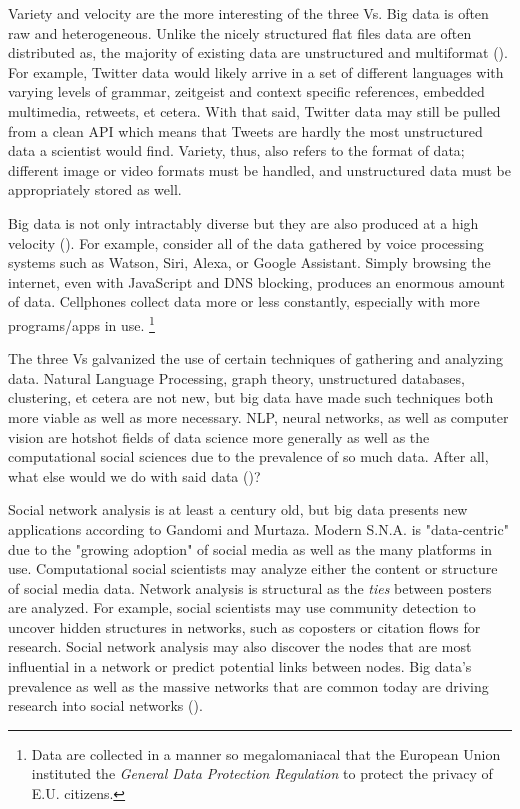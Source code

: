\documentclass[12pt, a4paper]{article}
\begin{document}
Variety and velocity are the more interesting of the three Vs. Big data is often raw and heterogeneous. Unlike the nicely structured flat files data are often distributed as, the majority of existing data are unstructured and multiformat (\cite{gandomiamir2015}). For example, Twitter data would likely arrive in a set of different languages with varying levels of grammar, zeitgeist and context specific references, embedded multimedia, retweets, et cetera. With that said, Twitter data may still be pulled from a clean API which means that Tweets are hardly the most unstructured data a scientist would find. Variety, thus, also refers to the format of data; different image or video formats must be handled, and unstructured data must be appropriately stored as well. 

Big data is not only intractably diverse but they are also produced at a high velocity (\cite{gandomiamir2015}). For example, consider all of the data gathered by voice processing systems such as Watson, Siri, Alexa, or Google Assistant. Simply browsing the internet, even with JavaScript and DNS blocking, produces an enormous amount of data. Cellphones collect data more or less constantly, especially with more programs/apps in use. \footnote{Data are collected in a manner so megalomaniacal that the European Union instituted the \textit{General Data Protection Regulation} to protect the privacy of E.U. citizens.}

The three Vs galvanized the use of certain techniques of gathering and analyzing data. Natural Language Processing, graph theory, unstructured databases, clustering, et cetera are not new, but big data have made such techniques both more viable as well as more necessary. NLP, neural networks, as well as computer vision are hotshot fields of data science more generally as well as the computational social sciences due to the prevalence of so much data. After all, what else would we do with said data (\cite{gandomiamir2015})? 

Social network analysis is at least a century old, but big data presents new applications according to Gandomi and Murtaza. Modern S.N.A. is "data-centric" due to the "growing adoption" of social media as well as the many platforms in use. Computational social scientists may analyze either the content or structure of social media data. Network analysis is structural as the \textit{ties} between posters are analyzed. For example, social scientists may use community detection to uncover hidden structures in networks, such as coposters or citation flows for research. Social network analysis may also discover the nodes that are most influential in a network or predict potential links between nodes. Big data's prevalence as well as the massive networks that are common today are driving research into social networks (\cite{gandomiamir2015}).
\end{document}

